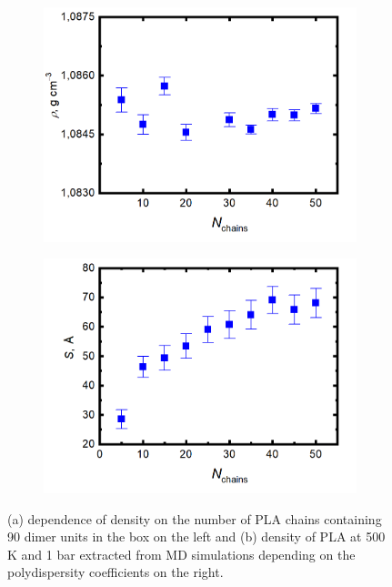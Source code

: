 \begin{figure}[htb!]
	\begin{subfigure}{0.5\textwidth}
		\centering
		\includegraphics[width=1\linewidth]{img/hustota_5_50_sigma.png}
		\caption{}
		\label{fig:box}
	\end{subfigure}
	\begin{subfigure}{0.5\textwidth}
		\centering
		\includegraphics[width=1\linewidth]{img/konce_5_50.png}
		\caption{}
		\label{fig:box_konce}
	\end{subfigure}   	
	\caption{(a) dependence of density on the number of PLA chains containing 90 dimer units in the box on the left and (b) density of PLA at 500 K and 1 bar extracted from MD simulations depending on the polydispersity coefficients on the right.}
	\vspace{-0.2cm}
\end{figure}

